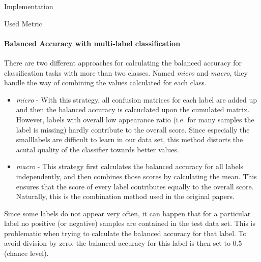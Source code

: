 \begin{section}{Implementation}
\begin{subsection}{Used Metric}
		\paragraph{Balanced Accuracy with multi-label classification}
		There are two different approaches for calculating the balanced accuracy for classification tasks with more than two classes. Named \emph{micro} and \emph{macro}, they handle the way of combining the values calculated for each class.
		\begin{itemize}
			\item \emph{micro} - With this strategy, all confusion matrices for each label are added up and then the balanced accuracy is calcuclated upon the cumulated matrix. However, labels with overall low appearance ratio (i.e. for many samples the label is missing) hardly contribute to the overall score. Since especially the \glqq small\grqq labels are difficult to learn in our data set, this method distorts the acutal quality of the classifier towards better values.
			\item \emph{macro} - This strategy first calculates the balanced accuracy for all labels independently, and then combines those scores by calculating the mean. This ensures that the score of every label contributes equally to the overall score. Naturally, this is the combination method used in the original papers.
		\end{itemize}
		Since some labels do not appear very often, it can happen that for a particular label no positive (or negative) samples are contained in the test data set. This is problematic when trying to calculate the balanced accuracy for that label. To avoid division by zero, the balanced accuracy for this label is then set to 0.5 (chance level).
		

	\end{subsection}
\end{section}
